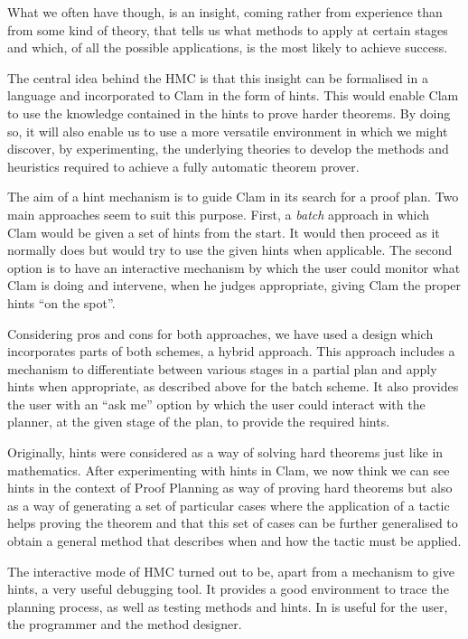         What we often have though, is an insight, coming rather from
experience than from some kind of theory, that tells us what methods to
apply at certain stages and which, of all the possible applications, is
the most likely to achieve success.

        The central idea behind the HMC is that this insight can be
formalised in a language and incorporated to Clam in the form of hints.
This would enable Clam to use the knowledge contained in the hints to
prove harder theorems.  By doing so, it will also enable us to use a
more versatile environment in which we might discover, by experimenting,
the underlying theories to develop the methods and heuristics required
to achieve a fully automatic theorem prover.

        The aim of a hint mechanism is to guide Clam in its search for a
proof plan. Two main approaches seem to suit this purpose. First, a {\em
batch} approach in which Clam would be given a set of hints from the
start. It would then proceed as it normally does but would try to use
the given hints when applicable. The second option is to have an
interactive mechanism by which the user could monitor what Clam is doing
and intervene, when he judges appropriate, giving Clam the proper hints
``on the spot''.

        Considering pros and cons for both approaches, we have used a
design which incorporates parts of both schemes, a hybrid approach.
This approach includes a mechanism to differentiate between various
stages in a partial plan and apply hints when appropriate, as described
above for the batch scheme. It also provides the user with an ``ask me''
option by which the user could interact with the planner, at the given
stage of the plan, to provide the required hints.

        Originally, hints were considered as a way of solving hard
theorems just like in mathematics. After experimenting with hints in
Clam, we now think we can see hints in the context of Proof Planning as
way of proving hard theorems but also as a way of generating a set of
particular cases where the application of a tactic helps proving the
theorem and that this set of cases can be further generalised to obtain
a general method that describes when and how the tactic must be applied.

        The interactive mode of HMC turned out to be, apart from a
mechanism to give hints, a very useful debugging tool. It provides a
good environment to trace the planning process, as well as testing
methods and hints. In is useful for the user, the programmer and the
method designer.

